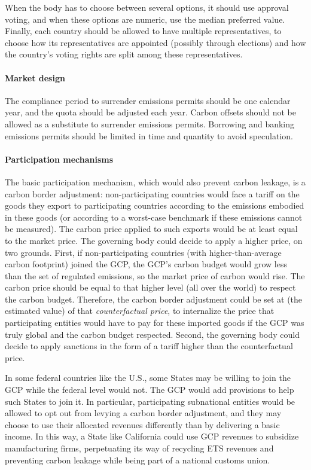 \documentclass[12pt,english]{article}
\begin{document}
When the body has to choose between several options, it should use approval voting, and when these options are numeric, use the median preferred value. Finally, each country should be allowed to have multiple representatives, to choose how its representatives are appointed (possibly through elections) and how the country's voting rights are split among these representatives. 

\paragraph{Market design} 
The compliance period to surrender emissions permits should be one calendar year, and the quota should be adjusted each year. Carbon offsets should not be allowed as a substitute to surrender emissions permits. Borrowing and banking emissions permits should be limited in time and quantity to avoid speculation. %

\paragraph{Participation mechanisms}

The basic participation mechanism, which would also prevent carbon leakage, is a carbon border adjustment: non-participating countries would face a tariff on the goods they export to participating countries according to the emissions embodied in these goods (or according to a worst-case benchmark if these emissions cannot be measured). The carbon price applied to such exports would be at least equal to the market price. The governing body could decide to apply a higher price, on two grounds. First, if non-participating countries (with higher-than-average carbon footprint) joined the GCP, the GCP's carbon budget would grow less than the set of regulated emissions, so the market price of carbon would rise. The carbon price should be equal to that higher level (all over the world) to respect the carbon budget. Therefore, the carbon border adjustment could be set at (the estimated value) of that \textit{counterfactual price}, to internalize the price that participating entities would have to pay for these imported goods if the GCP was truly global and the carbon budget respected. Second, the governing body could decide to apply sanctions in the form of a tariff higher than the counterfactual price. 

In some federal countries like the U.S., some States may be willing to join the GCP while the federal level would not. The GCP would add provisions to help such States to join it. In particular, participating subnational entities would be allowed to opt out from levying a carbon border adjustment, and they may choose %
to use their allocated revenues differently than by delivering a basic income. 
In this way, a State like California could use GCP revenues to subsidize manufacturing firms, perpetuating its way of recycling ETS revenues and preventing carbon leakage while being part of a national customs union. %
\end{document}
